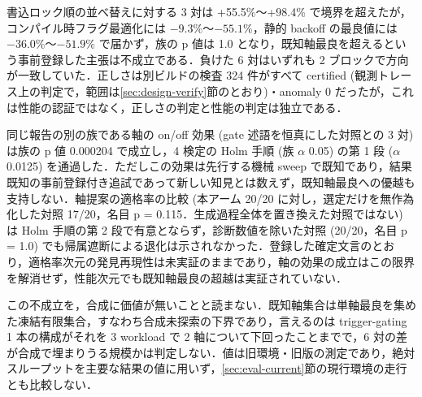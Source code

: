\documentclass[submit,techrep,noauthor]{ipsj}
\begin{document}
書込ロック順の並べ替えに対する 3 対は +55.5\%〜+98.4\% で境界を超えたが，コンパイル時フラグ最適化には $-9.3\%$〜$-55.1\%$，静的 backoff の最良値には $-36.0\%$〜$-51.9\%$ で届かず，族の p 値は 1.0 となり，既知軸最良を超えるという事前登録した主張は不成立である．負けた 6 対はいずれも 2 ブロックで方向が一致していた．正しさは別ビルドの検査 324 件がすべて certified (観測トレース上の判定で，範囲は\ref{sec:design-verify}節のとおり)・anomaly 0 だったが，これは性能の認証ではなく，正しさの判定と性能の判定は独立である．

同じ報告の別の族である軸の on/off 効果 (gate 述語を恒真にした対照との 3 対) は族の p 値 0.000204 で成立し，4 検定の Holm 手順 (族 $\alpha$ 0.05) の第 1 段 ($\alpha$ 0.0125) を通過した．ただしこの効果は先行する機械 sweep で既知であり，結果既知の事前登録付き追試であって新しい知見とは数えず，既知軸最良への優越も支持しない．軸提案の適格率の比較 (本アーム 20/20 に対し，選定だけを無作為化した対照 17/20，名目 p = 0.115．生成過程全体を置き換えた対照ではない) は Holm 手順の第 2 段で有意とならず，診断数値を除いた対照 (20/20，名目 p = 1.0) でも帰属遮断による退化は示されなかった．登録した確定文言のとおり，適格率次元の発見再現性は未実証のままであり，軸の効果の成立はこの限界を解消せず，性能次元でも既知軸最良の超越は実証されていない．

この不成立を，合成に価値が無いことと読まない．既知軸集合は単軸最良を集めた凍結有限集合，すなわち合成未探索の下界であり，言えるのは trigger-gating 1 本の構成がそれを 3 workload で 2 軸について下回ったことまでで，6 対の差が合成で埋まりうる規模かは判定しない．値は旧環境・旧版の測定であり，絶対スループットを主要な結果の値に用いず，\ref{sec:eval-current}節の現行環境の走行とも比較しない．
\end{document}
